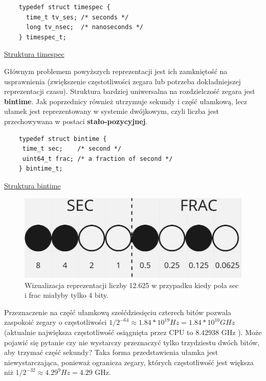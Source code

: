 \documentclass[shortabstract]{iithesis}
\theoremstyle{definition} \newtheorem*{definition}{Definicja}
\theoremstyle{definition} \newtheorem*{example}{Przykład}
\theoremstyle{definition} \newtheorem*{remark}{Uwaga}
\newenvironment{longlisting}{\captionsetup{type=listing}}{}
\begin{document}
\begin{longlisting}
  \begin{verbatim}
    typedef struct timespec {
      time_t tv_ses; /* seconds */
      long tv_nsec;  /* nanoseconds */
    } timespec_t;
  \end{verbatim}
  \caption{\href{https://mimiker.ii.uni.wroc.pl/source/xref/mimiker/include/sys/time.h?r=9505a819\#27}{Struktura timespec}}
  \label{lst:structts}
\end{longlisting}

Głównym problemem powyższych reprezentacji jest ich zamkniętość na usprawnienia (zwiększenie częstotliwości zegara lub potrzeba dokładniejszej reprezentacji czasu). Struktura bardziej uniwersalna na rozdzielczość zegara jest \textbf{bintime}. Jak poprzednicy również utrzymuje sekundy i część ułamkową, lecz ułamek jest reprezentowany w systemie dwójkowym, czyli liczba jest przechowywana w postaci \textbf{stało-pozycyjnej}.

\begin{longlisting}
  \begin{verbatim}
    typedef struct bintime {
     time_t sec;    /* second */
     uint64_t frac; /* a fraction of second */
    } bintime_t;
  \end{verbatim}
  \caption{\href{https://mimiker.ii.uni.wroc.pl/source/xref/mimiker/include/sys/time.h?r=9505a819\#32}{Struktura bintime}}
  \label{lst:structbt}
\end{longlisting}

\begin{figure}[ht]
\centering
\includegraphics[scale=0.4]{secfrac.png}
\caption{Wizualizacja reprezentacji liczby 12.625 w przypadku kiedy pola sec i frac miałyby tylko 4 bity.}
\end{figure}

Przeznaczenie na część ułamkową sześćdziesięciu czterech bitów pozwala zaspokoić zegary o częstotliwości $1/2^{-64} \approx 1.84 * 10^{19} Hz = 1.84* 10^{10} GHz $ (aktualnie największa częstotliwość osiągnięta przez CPU to $8.42938$ GHz \cite{bib:guinness}). Może pojawić się pytanie czy nie wystarczy przeznaczyć tylko trzydziestu dwóch bitów, aby trzymać część sekundy? Taka forma przedstawienia ułamka jest niewystarczająca, ponieważ ogranicza zegary, których częstotliwość jest większa niż $1/2^{-32} \approx 4.29^{9} Hz = 4.29$ GHz.
\end{document}

